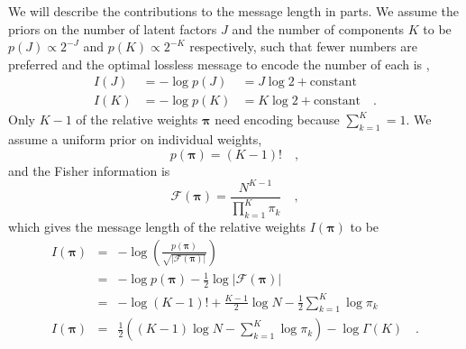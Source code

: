 \documentclass[twocolumn]{aastex62}
\newcommand{\vect}[1]{\boldsymbol{\mathbf{#1}}}
\renewcommand{\vec}[1]{\vect{#1}}
\newcommand{\weight}{\pi}
\newcommand{\NumData}{N}
\newcommand{\NumLatentFactors}{J}
\newcommand{\NumComponents}{K}
\newcommand{\numcomponents}{k}
\begin{document}
We will describe the contributions to the message length in parts. We assume
the priors on the number of latent factors $\NumLatentFactors$ and the
number of components $\NumComponents$ to be
$p(\NumLatentFactors) \propto 2^{-\NumLatentFactors}$ and
$p(\NumComponents) \propto 2^{-\NumComponents}$ respectively,
such that fewer numbers are preferred and the optimal lossless message to 
encode the number of each is \citep[p279, sec. 6.8.2;][]{Knorr-Held:2000},
\begin{eqnarray}
	I(\NumLatentFactors) &= -\log{p(\NumLatentFactors)} &= \NumLatentFactors\log{2} + \textrm{constant} \label{eq:prior_J} \\
	I(\NumComponents) &= -\log{p(\NumComponents)} &= \NumComponents\log{2} + \textrm{constant} \label{eq:prior_K} \quad .
\end{eqnarray}
Only $\NumComponents - 1$ of the relative weights $\vec\weight$ need encoding because 
$\sum_{\numcomponents=1}^{\NumComponents} = 1$. We assume a uniform prior on 
individual weights,
\begin{equation}
	p(\vec\weight) = (\NumComponents - 1)! \quad ,
\end{equation}
\noindent{}and the Fisher information is
\begin{equation}
	\mathcal{F}(\vec\weight) = \frac{\NumData^{\NumComponents - 1}}{\prod_{\numcomponents=1}^{\NumComponents}\weight_\numcomponents} \quad ,
\end{equation}
\noindent{}which gives the message length of the relative weights $I(\vec\weight)$ to be
\begin{eqnarray}
	I(\vec\weight) &=& -\log\left(\frac{p(\vec\weight)}{\sqrt{|\mathcal{F}(\vec\weight)|}}\right) \nonumber \\
			   &=& -\log{p(\vec\weight)} - \frac{1}{2}\log{|\mathcal{F}(\vec\weight)|} \nonumber  \\
			   &=& -\log(\NumComponents - 1)! + \frac{\NumComponents - 1}{2}\log{\NumData} - \frac{1}{2}\sum_{\numcomponents=1}^{\NumComponents}\log\weight_\numcomponents \nonumber \\
	I(\vec\weight) &=& \frac{1}{2}\left(\left(\NumComponents - 1\right)\log\NumData - \sum_{\numcomponents=1}^{\NumComponents}\log\weight_\numcomponents\right) -\log\Gamma(\NumComponents) \quad . \nonumber \label{eq:prior_pi} \\
\end{eqnarray}
\end{document}

